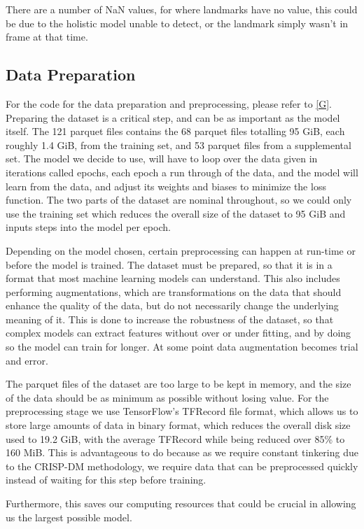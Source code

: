 \documentclass[preprint,11pt,review,authoryear]{elsarticle}
\begin{document}
There are a number of NaN values, for where landmarks have no value, this could be due to the holistic model unable to detect, or the landmark simply wasn't in frame at that time.

\subsection{Data Preparation}

For the code for the data preparation and preprocessing, please refer to \ref{G}. Preparing the dataset is a critical step, and can be as important as the model itself. The 121 parquet files contains the 68 parquet files totalling 95 GiB, each roughly 1.4 GiB, from the training set, and 53 parquet files from a supplemental set. The model we decide to use, will have to loop over the data given in iterations called epochs, each epoch a run through of the data, and the model will learn from the data, and adjust its weights and biases to minimize the loss function. The two parts of the dataset are nominal throughout, so we could only use the training set which reduces the overall size of the dataset to 95 GiB and inputs steps into the model per epoch.

Depending on the model chosen, certain preprocessing can happen at run-time or before the model is trained. The dataset must be prepared, so that it is in a format that most machine learning models can understand. This also includes performing augmentations, which are transformations on the data that should enhance the quality of the data, but do not necessarily change the underlying meaning of it. This is done to increase the robustness of the dataset, so that complex models can extract features without over or under fitting, and by doing so the model can train for longer. At some point data augmentation becomes trial and error.

The parquet files of the dataset are too large to be kept in memory, and the size of the data should be as minimum as possible without losing value. For the preprocessing stage we use TensorFlow's TFRecord file format, which allows us to store large amounts of data in binary format, which reduces the overall disk size used to 19.2 GiB, with the average TFRecord while being reduced over 85\% to 160 MiB. This is advantageous to do because as we require constant tinkering due to the CRISP-DM methodology, we require data that can be preprocessed quickly instead of waiting for this step before training.

Furthermore, this saves our computing resources that could be crucial in allowing us the largest possible model.
\end{document}
